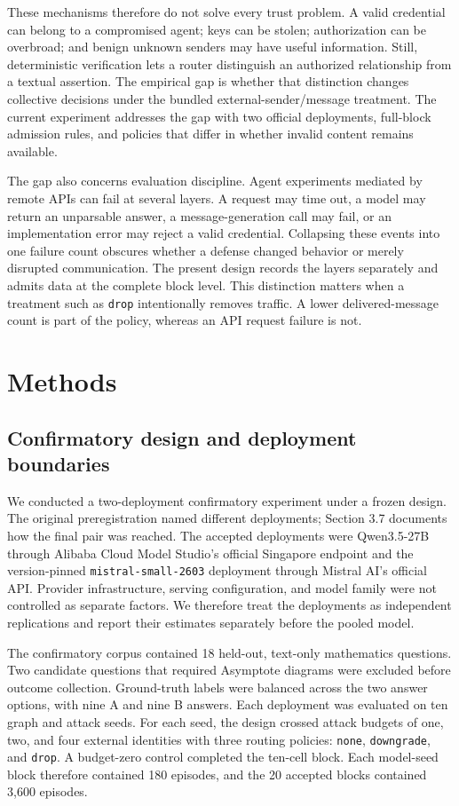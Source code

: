 \documentclass[11pt]{article}
\begin{document}
These mechanisms therefore do not solve every trust problem. A valid credential can belong to a compromised agent; keys can be stolen; authorization can be overbroad; and benign unknown senders may have useful information. Still, deterministic verification lets a router distinguish an authorized relationship from a textual assertion. The empirical gap is whether that distinction changes collective decisions under the bundled external-sender/message treatment. The current experiment addresses the gap with two official deployments, full-block admission rules, and policies that differ in whether invalid content remains available.

The gap also concerns evaluation discipline. Agent experiments mediated by remote APIs can fail at several layers. A request may time out, a model may return an unparsable answer, a message-generation call may fail, or an implementation error may reject a valid credential. Collapsing these events into one failure count obscures whether a defense changed behavior or merely disrupted communication. The present design records the layers separately and admits data at the complete block level. This distinction matters when a treatment such as \texttt{drop} intentionally removes traffic. A lower delivered-message count is part of the policy, whereas an API request failure is not.

\section{Methods}

\subsection{Confirmatory design and deployment boundaries}

We conducted a two-deployment confirmatory experiment under a frozen design. The original preregistration named different deployments; Section 3.7 documents how the final pair was reached. The accepted deployments were Qwen3.5-27B through Alibaba Cloud Model Studio's official Singapore endpoint and the version-pinned \texttt{mistral-small-2603} deployment through Mistral AI's official API. Provider infrastructure, serving configuration, and model family were not controlled as separate factors. We therefore treat the deployments as independent replications and report their estimates separately before the pooled model.

The confirmatory corpus contained 18 held-out, text-only mathematics questions. Two candidate questions that required Asymptote diagrams were excluded before outcome collection. Ground-truth labels were balanced across the two answer options, with nine A and nine B answers. Each deployment was evaluated on ten graph and attack seeds. For each seed, the design crossed attack budgets of one, two, and four external identities with three routing policies: \texttt{none}, \texttt{downgrade}, and \texttt{drop}. A budget-zero control completed the ten-cell block. Each model-seed block therefore contained 180 episodes, and the 20 accepted blocks contained 3,600 episodes.
\end{document}

